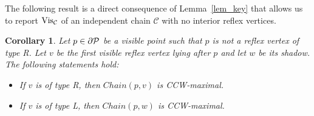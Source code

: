 \documentclass[a4paper]{article}
\newtheorem{corollary}{Corollary}
\newcommand{\C}{\ensuremath{{\mathcal C}}}
\begin{document}
The following result is a direct consequence of Lemma~\ref{lem_key} that allows us to report $\mathrm{Vis}_{\mathcal{C}}$ of an independent chain $\C$ with no interior reflex vertices. 

\begin{corollary}\label{corollary:CharacterizationVisibleReflex}
Let $p \in \partial \mathcal{P}$ be a visible point such that $p$ is not a reflex vertex of type R. 
Let $v$ be the first visible reflex vertex lying after $p$ and let $w$ be its shadow. The following statements hold:
\begin{itemize}
\vspace{-1mm}\item[-] If $v$ is of type R, then $Chain(p, v)$ is CCW-maximal.
\vspace{-1mm}\item[-] If $v$ is of type L, then $Chain(p, w)$ is CCW-maximal.
\end{itemize}
\end{corollary}
\end{document}
